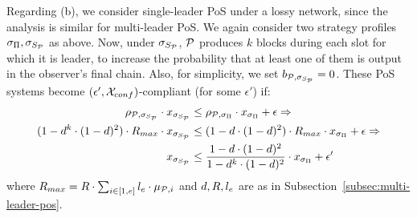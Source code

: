 Regarding (b), we consider single-leader PoS under a lossy network, since the
analysis is similar for multi-leader PoS. We again consider two strategy
profiles $\sigma_\Pi, \sigma_{S_{\mathcal{P}}}$ as above. Now, under
$\sigma_{S_{\mathcal{P}}}$, $\mathcal{P}$ produces $k$ blocks during each slot for which
it is leader, to increase the probability that at least one of them is output
in the observer's final chain. Also, for simplicity, we set
$b_{\mathcal{P}, \sigma_{S_{\mathcal{P}}}} = 0$. These PoS
systems become $(\epsilon', \mathcal{X}_{conf})$-compliant (for
some $\epsilon'$) if:
\begin{align}
    \rho_{\mathcal{P}, \sigma_{S_{\mathcal{P}}}} \cdot x_{\sigma_{S_{\mathcal{P}}}} &\leq \rho_{\mathcal{P}, \sigma_\Pi} \cdot x_{\sigma_\Pi} + \epsilon \Rightarrow \nonumber \\
    (1 - d^k \cdot (1 - d)^2) \cdot R_{max} \cdot x_{\sigma_{S_{\mathcal{P}}}} &\leq (1 - d \cdot (1 - d)^2) \cdot R_{max} \cdot x_{\sigma_\Pi} + \epsilon \Rightarrow \nonumber \\
    x_{\sigma_{S_{\mathcal{P}}}} &\leq \frac{1 - d \cdot (1 - d)^2}{1 - d^k \cdot (1 - d)^2} \cdot x_{\sigma_\Pi} + \epsilon'
\end{align}
where $R_{max} = R \cdot \sum_{i \in [1, e]} l_e \cdot \mu_{\mathcal{P}, i}$ and $d, R, l_e$ are as in Subsection~\ref{subsec:multi-leader-pos}.
